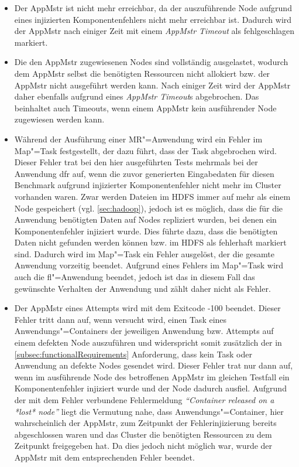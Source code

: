 \begin{itemize}
    \item
        Der \gls{AppMstr} ist nicht mehr erreichbar, da der auszuführende Node aufgrund eines injizierten Komponentenfehlers nicht mehr erreichbar ist.
        Dadurch wird der \gls{AppMstr} nach einiger Zeit mit einem \emph{\gls{AppMstr} Timeout} als fehlgeschlagen markiert.
    \item
        Die den \gls{AppMstr} zugewiesenen Nodes sind vollständig ausgelastet, wodurch dem \gls{AppMstr} selbst die benötigten Ressourcen nicht allokiert bzw. der \gls{AppMstr} nicht ausgeführt werden kann.
        Nach einiger Zeit wird der \gls{AppMstr} daher ebenfalls aufgrund eines \emph{\gls{AppMstr} Timeout}s abgebrochen.
        Das beinhaltet auch Timeouts, wenn einem \gls{AppMstr} kein ausführender Node zugewiesen werden kann.
    \item
        Während der Ausführung einer \gls{MR}"=Anwendung wird ein Fehler im Map"=Task festgestellt, der dazu führt, dass der Task abgebrochen wird.
        Dieser Fehler trat bei den hier ausgeführten \glspl{Test} mehrmals bei der \gls{Anwendung} \acrlong{dfr} auf, wenn die zuvor generierten Eingabedaten für diesen Benchmark aufgrund injizierter Komponentenfehler nicht mehr im Cluster vorhanden waren.
        Zwar werden Dateien im \gls{HDFS} immer auf mehr als einem Node gespeichert (vgl. \cref{sec:hadoop}), jedoch ist es möglich, dass die für die \gls{Anwendung} benötigten Daten auf Nodes repliziert wurden, bei denen ein Komponentenfehler injiziert wurde.
        Dies führte dazu, dass die benötigten Daten nicht gefunden werden können bzw. im \gls{HDFS} als fehlerhaft markiert sind.
        Dadurch wird im Map"=Task ein Fehler ausgelöst, der die gesamte \gls{Anwendung} vorzeitig beendet.
        Aufgrund eines Fehlers im Map"=Task wird auch die \acrlong{fl}"=Anwendung beendet, jedoch ist das in diesem Fall das gewünschte Verhalten der \gls{Anwendung} und zählt daher nicht als Fehler.
    \item
        Der \gls{AppMstr} eines \glspl{Attempt} wird mit dem Exitcode -100 beendet.
        Dieser Fehler tritt dann auf, wenn versucht wird, einen Task eines Anwendungs"=Containers der jeweiligen \gls{Anwendung} bzw. Attempts auf einem defekten Node auszuführen und widerspricht somit zusätzlich der in \cref{subsec:functionalRequirements} Anforderung, dass kein Task oder \gls{Anwendung} an defekte Nodes gesendet wird.
        Dieser Fehler trat nur dann auf, wenn im ausführende Node des betroffenen \gls{AppMstr} im gleichen \gls{Testfall} ein Komponentenfehler injiziert wurde und der Node dadurch ausfiel.
        Aufgrund der mit dem Fehler verbundene Fehlermeldung \emph{\enquote{Container released on a *lost* node}} liegt die Vermutung nahe, dass Anwendungs"=Container, hier wahrscheinlich der \gls{AppMstr}, zum Zeitpunkt der Fehlerinjizierung bereits abgeschlossen waren und das Cluster die benötigten Ressourcen zu dem Zeitpunkt freigegeben hat.
        Da dies jedoch nicht möglich war, wurde der \gls{AppMstr} mit dem entsprechenden Fehler beendet.
\end{itemize}

